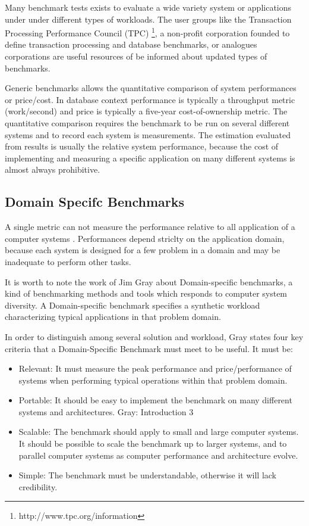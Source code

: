 Many benchmark tests exists to evaluate a wide variety system or applications under under different types of workloads. The user groups like the Transaction Processing Performance Council (TPC) \footnote{http://www.tpc.org/information},  a non-profit corporation founded to define transaction processing and database benchmarks, or analogues corporations are useful resources of be informed about updated types of benchmarks. 

Generic benchmarks allows the quantitative comparison of system performances or price/cost. In database context performance is typically a throughput metric (work/second) and price is typically a five-year cost-of-ownership metric. The quantitative comparison requires the benchmark to be run on several different systems and to record each system is measurements.  The estimation evaluated from results is usually the relative system performance, because the cost of implementing and measuring a specific application on many different systems is almost always prohibitive.

\subsection{Domain Specifc Benchmarks}  \label{sec:tcp}

A single metric can not measure the performance relative to all application of a computer systems \cite{DBLP:books/mk/Gray93}. Performances depend striclty on the application domain, because each system is designed for a few problem in a domain and may be inadequate to perform other tasks.

It is worth to note the work of Jim Gray about Domain-specific benchmarks, a kind of benchmarking methods and tools  which responds to computer system diversity. A Domain-specific benchmark specifies a synthetic workload characterizing typical applications in that problem domain. 

In order to distinguish among several solution and workload, Gray states four key criteria that a Domain-Specific Benchmark must meet to be useful\cite{DBLP:books/mk/Gray93}. It must be:
\begin{itemize}
\item Relevant: It must measure the peak performance and price/performance of systems when performing typical operations within that problem domain.
\item Portable: It should be easy to implement the benchmark on many different systems and architectures.
Gray: Introduction 3
\item Scalable: The benchmark should apply to small and large computer systems. It should be possible to scale the benchmark up to larger systems, and to parallel computer systems as computer performance and architecture evolve.
\item Simple: The benchmark must be understandable, otherwise it will lack credibility.
\end{itemize} 


